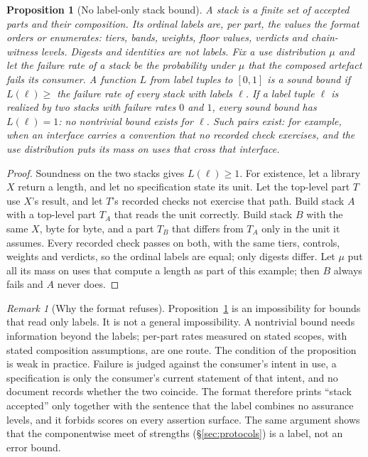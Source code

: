 \documentclass[11pt]{article}
\newtheorem{proposition}{Proposition}
\theoremstyle{definition}
\theoremstyle{remark}
\newtheorem{remark}{Remark}
\begin{document}
\begin{proposition}[No label-only stack bound]\label{prop:agg}
A \emph{stack} is a finite set of accepted parts and their composition. Its \emph{ordinal labels}
are, per part, the values the format orders or enumerates: tiers, bands, weights, floor values,
verdicts and chain-witness levels. Digests and identities are not labels. Fix a use distribution
$\mu$ and let the \emph{failure rate} of a stack be the probability under $\mu$ that the composed
artefact fails its consumer. A function $L$ from label tuples to $[0,1]$ is a \emph{sound bound} if
$L(\ell)\ge$ the failure rate of every stack with labels $\ell$. If a label tuple $\ell$ is realized
by two stacks with failure rates $0$ and $1$, every sound bound has $L(\ell)=1$: no nontrivial bound
exists for $\ell$. Such pairs exist: for example, when an interface carries a convention that no
recorded check exercises, and the use distribution puts its mass on uses that cross that interface.
\end{proposition}
\begin{proof}
Soundness on the two stacks gives $L(\ell)\ge 1$. For existence, let a library $X$ return a length,
and let no specification state its unit. Let the top-level part $T$ use $X$'s result, and let $T$'s
recorded checks not exercise that path. Build stack $A$ with a top-level part $T_A$ that reads the
unit correctly. Build stack $B$ with the same $X$, byte for byte, and a part $T_B$ that differs from
$T_A$ only in the unit it assumes. Every recorded check passes on both, with the same tiers,
controls, weights and verdicts, so the ordinal labels are equal; only digests differ. Let $\mu$ put
all its mass on uses that compute a length as part of this example; then $B$ always fails and $A$
never does.
\end{proof}

\begin{remark}[Why the format refuses]
Proposition~\ref{prop:agg} is an impossibility for bounds that read only labels. It is not a
general impossibility. A nontrivial bound needs information beyond the labels; per-part rates
measured on stated scopes, with stated composition assumptions, are one route. The condition of
the proposition is weak in practice. Failure is judged against the consumer's intent in use, a
specification is only the consumer's current statement of that intent, and no document records
whether the two coincide. The format therefore prints ``stack accepted'' only together with the
sentence that the label combines no assurance levels, and it forbids scores on every assertion
surface. The same argument shows that the componentwise meet of strengths (§\ref{sec:protocols})
is a label, not an error bound.
\end{remark}
\end{document}
